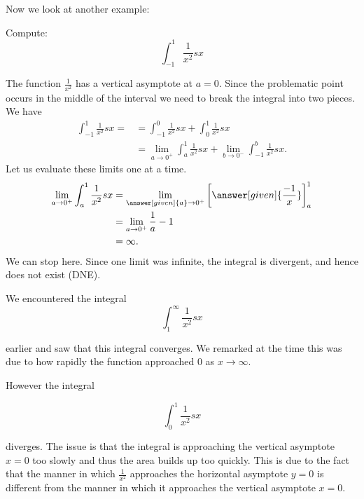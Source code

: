 \documentclass{ximera}
\begin{document}
Now we look at another example: 

\begin{example}	
  Compute:
  \[
  \int_{-1}^1 \frac{1}{x^2} sx
  \]
  \begin{explanation}
    The function $\frac{1}{x^2}$ has a vertical asymptote at $a=0$. Since the problematic point 
occurs in the middle of the interval we need to break the integral into two pieces.
  We have
\begin{align*}
  \int_{-1}^1 \frac{1}{x^2} sx =&= \int_{-1}^{0} \frac{1}{x^2} sx + \int_{0}^{1} \frac{1}{x^2} sx \\
&= \lim_{a \to 0^+} \int_{a}^1 \frac{1}{x^2} sx  + \lim_{b \to 0^-} \int_{-1}^{b} \frac{1}{x^2} sx.
 \end{align*}
  Let us evaluate these limits one at a time.
  \begin{align*}
    \lim_{a \to 0^+} \int_{a}^1 \frac{1}{x^2} sx  &=  \lim_{\answer[given]{a} \to 0^+} \bigg[\answer[given]{\frac{-1}{x}}\bigg]_a^1 \\
    &=  \lim_{a \to 0^+} \frac{1}{a}-1\\
    &= \infty.
  \end{align*}
    We can stop here. Since one limit was infinite, the integral is
    divergent, and hence does not exist (DNE). 
  \end{explanation}
\end{example}

\begin{remark}
We encountered the integral
\[
\int_{1}^{\infty} \frac{1}{x^2} sx 
\]

earlier and saw that this integral converges. We remarked at the time this was due to how rapidly the function approached $0$ as $x \to \infty$. 

However the integral

\[
\int_{0}^{1} \frac{1}{x^2} sx 
\]

diverges. The issue is that the integral is approaching the vertical asymptote $x=0$ too slowly and thus the area builds up too quickly. This is due to the fact that the manner in which $\frac{1}{x^2}$ approaches the horizontal asymptote $y=0$ is different from the manner in which 
it approaches the vertical asymptote $x=0$. 
\end{remark}
\end{document}
